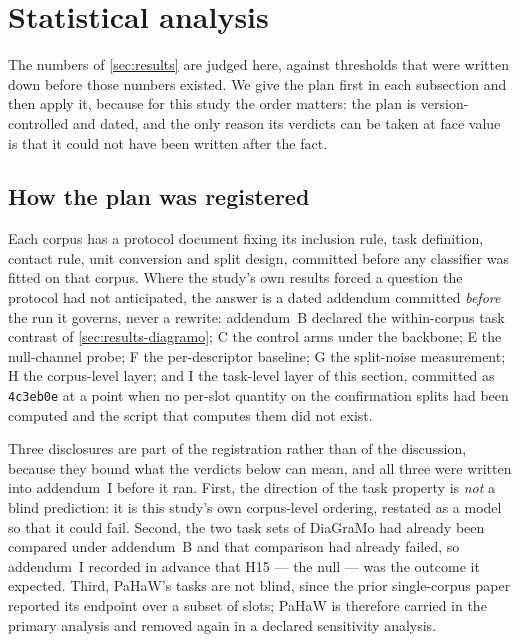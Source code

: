 
\section{Statistical analysis}
\label{sec:statistics}

The numbers of \cref{sec:results} are judged here, against thresholds that were written down before
those numbers existed. We give the plan first in each subsection and then apply it, because for
this study the order matters: the plan is version-controlled and dated, and the only reason its
verdicts can be taken at face value is that it could not have been written after the fact.

\subsection{How the plan was registered}
\label{sec:registration}

Each corpus has a protocol document fixing its inclusion rule, task definition, contact rule, unit
conversion and split design, committed before any classifier was fitted on that corpus. Where the
study's own results forced a question the protocol had not anticipated, the answer is a dated
addendum committed \emph{before} the run it governs, never a rewrite: addendum~B declared the
within-corpus task contrast of \cref{sec:results-diagramo}; C the control arms under the backbone;
E the null-channel probe; F the per-descriptor baseline; G the split-noise measurement; H the
corpus-level layer; and I the task-level layer of this section, committed as \texttt{4c3eb0e} at a
point when no per-slot quantity on the confirmation splits had been computed and the script that
computes them did not exist.

Three disclosures are part of the registration rather than of the discussion, because they bound
what the verdicts below can mean, and all three were written into addendum~I before it ran. First,
the direction of the task property is \emph{not} a blind prediction: it is this study's own
corpus-level ordering, restated as a model so that it could fail. Second, the two task sets of
DiaGraMo had already been compared under addendum~B and that comparison had already failed, so
addendum~I recorded in advance that H15 --- the null --- was the outcome it expected. Third, PaHaW's
tasks are not blind, since the prior single-corpus paper reported its endpoint over a subset of
slots; PaHaW is therefore carried in the primary analysis and removed again in a declared
sensitivity analysis.

